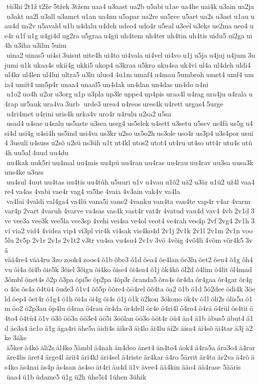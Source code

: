 tü3hi 2t1ž t2že 5tžek 3tžem uaa4 u3aast ua2b u5abi u1ae ua4he uai4k u3ain ua2ja u3akt ua2l u3all u3amet u1an ua4nu u5apar ua2re ua5ree u5art ua2s u3ast u1au uau4d ua2v u5avald u1b u4dalu u4deh udeo4 udo4r u5eal u3eel u3eks ue2ma ueo4 ue4r u1f u1g u4gi4d ug2ra u5graa u4gü uh4tem uh4ter uh4tin uh4tis uidu5 ui2ga ui4h u3iha u3ilm 5uim  uina2 uinas5 ui4si 3uisut uite4h ui4to ui4vala ui4vel ui4vo u1j u5ja u4juj u4jum 3ujumi u1k ukaa4s ukii4g ukki5 ukop4 u3kraa u5kro uku4sa uk4vi ul4a ul4deh uldi4 ul4kr ul4len ul4lui ultra5 u3lu uluo4 4u1m umaf4 u4mau 5umbroh umet4 umf4 umia4 umit4 um5p4r unaa4 unaal5 un4dak un4dan un4das un4do u4ni  u1o2 uo4h u2or u3org u1p u3pla up3le uppe4 up4pis uraa4l u4rag ura4ju u4rala u4rap ur5auk ura4va 3urb  urde3 urea4 u4reos ures4k u4rett urgas4 5urge  u4ri4met u4rini uris4k urka4v uro4r u4rulu u2sa2 u5sa  usad4 u4sae u4salu us5aste u3sea useg4 us5elek u4sett u3setu u5sev us4fä us5g u4si4d usi4g u4si4h us5ind usi4va us3kr u2so us5o2h us3ole uso4r us3p4 u3s4por usui4 3usuli u4suss u2sõ u2sü us3üh u1t ut4kl utos2 utot4 ut4ru ut4so utt4r utu4s utü4h uu5al 4uud uu4du  uu4kak uuk5ri uu4mal uu4mis uu4pü uu4ran uu4ras uu4rau uu4rav uu3sa uusa3k uus4ke u3uss  uu4sul 4uut uu4tas uu4tis uu4tüh u5uuri u1v u4vau u1õ2 uä2 u3är u1ü2 už4l vaa4re4 va4as 4vabi vae4r vag4 va5he 4vaia 4v3ain vak4v va4la  va4lai 4valdi val4ga4 va4lü vana5i vane2 4vanku van4ta van4te vap4r v4ar 4varm var4p 2vart 4varuh 4varve va4sas vas4k vast4r vat4r 4vatud vau4d vav4 4vb 2v1d 3ve vee3a vee3k vee5la vee3sp 4vehi vei4sa ve4ol veot4 ve4rah ves4p 2vf 2vg4 2v1h 3vi via2 vid4 4videa vip4 vi3pl vir4k vi4sak vis4ko4d 2v1j 2v1k 2v1l 2v1m 2v1n voo5lu 2v5p 2v1r 2v1s 2v1t2 v3tr vu4sa vu4su4 2v1v 3võ 4võig 4võ4li 4võm võr4k5 3vä 	vää4re4 vää4ru 3zo zook4 zoos4 õ1b õbe3 õ1d õea4 õe4lan õe3lu õet2 õeu4 õ1g õh4vu õi4a õi4b õie5k 3õiel 3õigu õi4ko õise4 õi4su4 õ1j õk4kõ õl2d õ4lim õ4lit õl4mad 3õmbl õnet4s õ2p õ3pa õpi5e õp2pa 4õp3r õranda5 õra4s õr4da õr4gaa õr4gar õr4go 4õs õs4a õ4tü4 õude3 õ1v4 õõ5p õõre4 õõ4rel õõ4ta öa2 ö1b ö1d 5ö2dee ödi4k 3öeld öep4 öet4r ö1g4 ö1h öi4a öi4g öi4s ö1j ö1k ö2kon 3ökono ök4v ö1l öli2s ölis5a ö1m öo2 ö2p3au öp4lu ö4raa ö4rau ör4da ör4dell ör4e ö4ri4l ö4ro4 ö4rä ö4rül ös4tii ö4to4 ö4tü4 ö1v ö3õ öö3a öö3e4 öö5i 3öölan öö3o ööt4r öü4 äa4 ä1b äbus5 äbut4 ä1d äe3a4 äe1o ä1g äga4ri ähe5a äidi4s äike3 äi4lo äi4lu äi2s äisa4 äi4sõ äi4tar ä3j ä2ke 3äke  ä5ker ä4kõ äli2s äl4ko 5ämbl ä4nah än4deo änet4 än4to4 äok4 ä4ra5a ära3o4 ä4rar äre4lis äret4 ärge4l ärii4 äri4kl äri4sel ä4riste är4kar ä4ro 5ärrit är4ta är2va ä4rõ äs4ko äs4nai äs4p äs4san äs4so ät4ri äu4d ä1v ävee4 ää4kin ääo4 	ää4rase 	5ääris  üaa4 ü1b üdame5 ü1g ü2h ühe5i4 1ühen 3ühik 